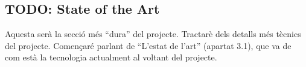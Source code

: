 
\subsection{TODO: State of the Art}

Aquesta serà la secció més ``dura'' del projecte. Tractarè dels detalls més
tècnics del projecte. Començaré parlant de ``L'estat de l'art'' (apartat 3.1),
que va de com està la tecnologia actualment al voltant del projecte.
